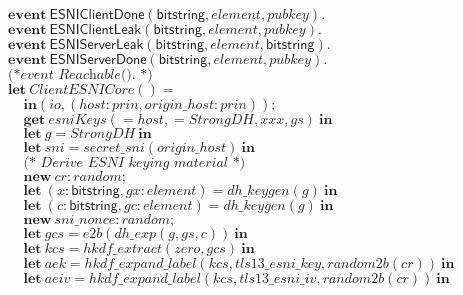 \documentclass{article}
\newcommand{\kwl}[1]{\mathbf{#1}}
\newcommand{\kwt}[1]{\mathsf{#1}}
\newcommand{\kwe}[1]{\mathsf{#1}}
\newcommand{\var}[1]{\mathit{#1}}
\theoremstyle{definition}
\begin{document}
\begin{tabbing}
$\kwl{event}\ \kwe{ESNIClientDone}(\kwt{bitstring}, \var{element}, \var{pubkey}). $\\
$\kwl{event}\ \kwe{ESNIClientLeak}(\kwt{bitstring}, \var{element}, \var{pubkey}). $\\
$\kwl{event}\ \kwe{ESNIServerLeak}(\kwt{bitstring}, \var{element}, \kwt{bitstring}). $\\
$\kwl{event}\ \kwe{ESNIServerDone}(\kwt{bitstring}, \var{element}, \var{pubkey}). $\\
$\textit{(*event Reachable(). *)} $\\
$ $\\
$\kwl{let}\ \var{ClientESNICore}() =  $\\
$\ \ \ \ \ \kwl{in}(\var{io}, (\var{host}{:}\var{prin}, \var{origin{\_}host}{:}\var{prin})); $\\
$\ \ \ \ \ \kwl{get}\ \var{esniKeys}( = \var{host},  = \var{StrongDH}, \var{xxx}, \var{gs})\ \kwl{in} $\\
$\ \ \ \ \ \kwl{let}\ \var{g} = \var{StrongDH}\ \kwl{in} $\\
$\ \ \ \ \ \kwl{let}\ \var{sni} = \var{secret{\_}sni}(\var{origin{\_}host})\ \kwl{in} $\\
$ $\\
$\ \ \ \ \ \textit{(* Derive ESNI keying material *)} $\\
$\ \ \ \ \ \kwl{new}\ \var{cr}{:}\var{random}; $\\
$\ \ \ \ \ \kwl{let}\ (\var{x}{:}\kwt{bitstring}, \var{gx}{:}\var{element}) = \var{dh{\_}keygen}(\var{g})\ \kwl{in} $\\
$\ \ \ \ \ \kwl{let}\ (\var{c}{:}\kwt{bitstring}, \var{gc}{:}\var{element}) = \var{dh{\_}keygen}(\var{g})\ \kwl{in} $\\
$\ \ \ \ \ \kwl{new}\ \var{sni{\_}nonce}{:}\var{random}; $\\
$\ \ \ \ \ \kwl{let}\ \var{gcs} = \var{e2b}(\var{dh{\_}exp}(\var{g}, \var{gs}, \var{c}))\ \kwl{in} $\\
$\ \ \ \ \ \kwl{let}\ \var{kcs} = \var{hkdf{\_}extract}(\var{zero}, \var{gcs})\ \kwl{in} $\\
$\ \ \ \ \ \kwl{let}\ \var{aek} = \var{hkdf{\_}expand{\_}label}(\var{kcs}, \var{tls13{\_}esni{\_}key}, \var{random2b}(\var{cr}))\ \kwl{in} $\\
$\ \ \ \ \ \kwl{let}\ \var{aeiv} = \var{hkdf{\_}expand{\_}label}(\var{kcs}, \var{tls13{\_}esni{\_}iv}, \var{random2b}(\var{cr}))\ \kwl{in} $\\
$ $\\

\end{tabbing}
\end{document}
